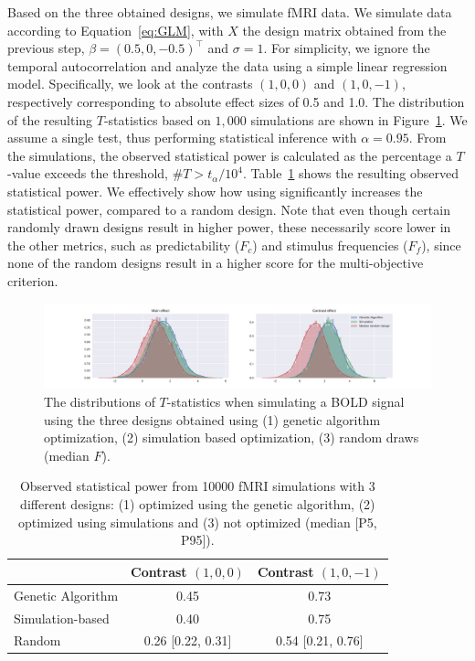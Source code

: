\documentclass[article]{jss}
\begin{document}
Based on the three obtained designs, we simulate fMRI data.  We
simulate data according to Equation~\ref{eq:GLM}, with $X$ the design
matrix obtained from the previous step, $\beta=(0.5,0,-0.5)^{\top}$
and $\sigma=1$.  For simplicity, we ignore the temporal
autocorrelation and analyze the data using a simple linear regression
model.  Specifically, we look at the contrasts $(1,0,0)$ and
$(1,0,-1)$, respectively corresponding to absolute effect sizes of 0.5
and 1.0.  The distribution of the resulting $T$-statistics based on
$1,000$ simulations are shown in Figure~\ref{distributions}.  We
assume a single test, thus performing statistical inference with
$\alpha=0.95$.  From the simulations, the observed statistical power
is calculated as the percentage a $T$-value exceeds the threshold,
$\#{T>t_\alpha}/10^4$.  Table~\ref{power} shows the resulting observed
statistical power. We effectively show how using 
significantly increases the statistical power, compared to a random
design.  Note that even though certain randomly drawn designs result
in higher power, these necessarily score lower in the other metrics,
such as predictability ($F_c$) and stimulus frequencies ($F_f$), since
none of the random designs result in a higher score for the
multi-objective criterion.
%
\begin{figure}[t!]
\centering
\includegraphics[scale=0.35]{distributions.pdf}
\caption{The distributions of $T$-statistics when simulating a BOLD
  signal using the three designs obtained using (1) genetic algorithm
  optimization, (2) simulation based optimization, (3) random draws
  (median $F$).\label{distributions}}
\end{figure}


 \begin{table}[t!]
     \centering
 \begin{tabular}{lcc}
 \hline   
 & {Contrast $(1,0,0)$} & {Contrast $(1,0,-1)$} \\
 \hline
 \multicolumn{1}{l}{Genetic Algorithm} &     0.45    & 0.73 \\
 \multicolumn{1}{l}{Simulation-based} &      0.40    & 0.75 \\
 \multicolumn{1}{l}{Random} &                0.26 [0.22, 0.31]    & 0.54 [0.21, 0.76] \\
\hline
 \end{tabular}
 \caption{Observed statistical power from 10000 fMRI simulations with
   3 different designs: (1) optimized using the genetic algorithm, (2)
   optimized using simulations and (3) not optimized (median [P5,
   P95]). \label{power}}
 \end{table}
\end{document}
